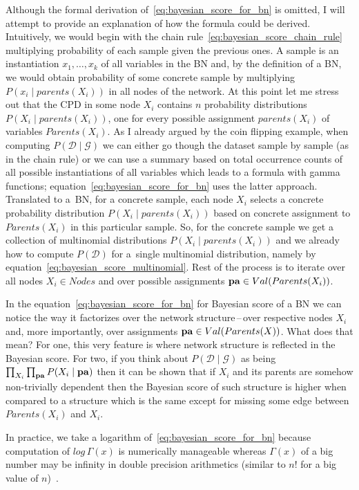 \documentclass[english,cover]{fitthesis} %
\newcommand{\vars}[1]{{\bold{#1}}}         %
\begin{document}
Although the formal derivation of~\eqref{eq:bayesian_score_for_bn} is omitted, I will attempt to provide an explanation of how the formula could be derived. Intuitively, we would begin with the chain rule~\eqref{eq:bayesian_score_chain_rule} multiplying probability of each sample given the previous ones. A sample is an instantiation $x_1, \dots, x_k$ of all variables in the BN and, by the definition of a BN, we would obtain probability of some concrete sample by multiplying $P(x_i \mid parents(X_i))$ in all nodes of the network. At this point let me stress out that the CPD in some node $X_i$ contains $n$ probability distributions $P(X_i \mid parents(X_i))$, one for every possible assignment $parents(X_i)$ of variables $Parents(X_i)$. As I already argued by the coin flipping example, when computing $P(\mathcal{D} \mid \mathcal{G})$ we can either go though the dataset sample by sample (as in the chain rule) or we can use a summary based on total occurrence counts of all possible instantiations of all variables which leads to a formula with gamma functions; equation~\eqref{eq:bayesian_score_for_bn} uses the latter approach. Translated to a~BN, for a concrete sample, each node $X_i$ selects a concrete probability distribution $P(X_i \mid parents(X_i))$ based on concrete assignment to $Parents(X_i)$ in this particular sample. So, for the concrete sample we get a collection of multinomial distributions $P(X_i \mid parents(X_i))$ and we already how to compute $P(\mathcal{D})$ for a~single multinomial distribution, namely by equation~\eqref{eq:bayesian_score_multinomial}. Rest of the process is to iterate over all nodes $X_i \in Nodes$ and over possible assignments $\vars{pa} \in Val(Parents(X_i))$.

In the equation~\eqref{eq:bayesian_score_for_bn} for Bayesian score of a BN we can notice the way it factorizes over the network structure\,--\,over respective nodes $X_i$ and, more importantly, over assignments $\vars{pa} \in Val(Parents(X))$. What does that mean? For one, this very feature is where network structure is reflected in the Bayesian score. For two, if you think about $P(\mathcal{D} \mid \mathcal{G})$ as being $\prod_{X_i} \prod_{\vars{pa}} P(X_i \mid \vars{pa})$ then it can be shown that if $X_i$ and its parents are somehow non-trivially dependent then the Bayesian score of such structure is higher when compared to a structure which is the same except for missing some edge between $Parents(X_i)$ and $X_i$.


\medskip

In practice, we take a logarithm of~\eqref{eq:bayesian_score_for_bn} because computation of $log \, \Gamma(x)$ is numerically manageable whereas $\Gamma(x)$ of a big number may be infinity in double precision arithmetics (similar to $n!$ for a big value of $n$)~\cite[p.~801]{pgm}.
\end{document}
